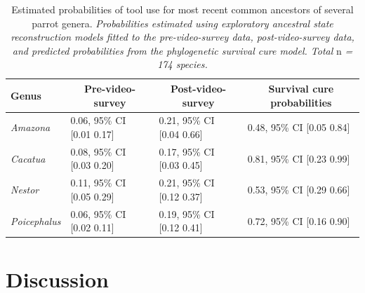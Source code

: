 \documentclass[
  man, donotrepeattitle,floatsintext]{apa6}
\begin{document}
\begin{table}[tbp]

\begin{center}
\begin{threeparttable}

\caption{\label{tab:tableASR}Estimated probabilities of tool use for most recent common
ancestors of several parrot genera. \emph{Probabilities estimated using exploratory
ancestral state reconstruction models fitted to the pre-video-survey data,
post-video-survey data, and predicted probabilities from the phylogenetic
survival cure model. Total} n \emph{= 174 species.}}

\begin{tabular}{llll}
\toprule
Genus & \multicolumn{1}{c}{Pre-video-survey} & \multicolumn{1}{c}{Post-video-survey} & \multicolumn{1}{c}{Survival cure probabilities}\\
\midrule
\textit{Amazona} & 0.06, 95\% CI [0.01 0.17] & 0.21, 95\% CI [0.04 0.66] & 0.48, 95\% CI [0.05 0.84]\\
\textit{Cacatua} & 0.08, 95\% CI [0.03 0.20] & 0.17, 95\% CI [0.03 0.45] & 0.81, 95\% CI [0.23 0.99]\\
\textit{Nestor} & 0.11, 95\% CI [0.05 0.29] & 0.21, 95\% CI [0.12 0.37] & 0.53, 95\% CI [0.29 0.66]\\
\textit{Poicephalus} & 0.06, 95\% CI [0.02 0.11] & 0.19, 95\% CI [0.12 0.41] & 0.72, 95\% CI [0.16 0.90]\\
\bottomrule
\end{tabular}

\end{threeparttable}
\end{center}

\end{table}

\hypertarget{discussion}{%
\section{Discussion}\label{discussion}}
\end{document}

